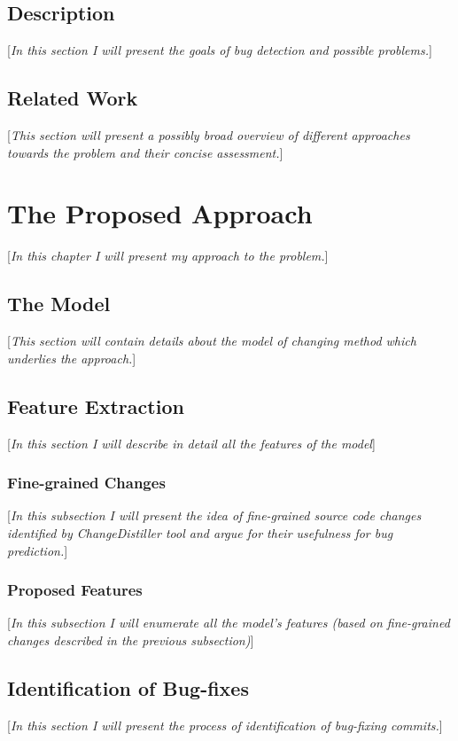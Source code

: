 \documentclass{pracamgr}
\begin{document}
\section{Description}
[\textit{In this section I will present the goals of bug detection and possible problems.}]

\section{Related Work}
[\textit{This section will present a possibly broad overview of different approaches towards the problem and their concise assessment.}]

\chapter{The Proposed Approach}
[\textit{In this chapter I will present my approach to the problem.}]

\section{The Model}
[\textit{This section will contain details about the model of changing method which underlies the approach.}]

\section{Feature Extraction}
[\textit{In this section I will describe in detail all the features of the model}]

\subsection{Fine-grained Changes}
[\textit{In this subsection I will present the idea of fine-grained source code changes identified by ChangeDistiller tool and argue for their usefulness for bug prediction.}]

\subsection{Proposed Features}
[\textit{In this subsection I will enumerate all the model's features (based on fine-grained changes described in the previous subsection)}]

\section{Identification of Bug-fixes}
[\textit{In this section I will present the process of identification of bug-fixing commits.}]
\end{document}
